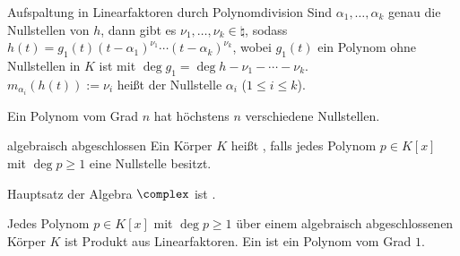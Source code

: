 \begin{Satz}{Aufspaltung in Linearfaktoren durch Polynomdivision}
    Sind $\alpha_1, \ldots, \alpha_k$ genau die Nullstellen von $h$, dann
    gibt es $\nu_1, \ldots, \nu_k \in \natural$, sodass
    $h(t) = g_1(t) (t - \alpha_1)^{\nu_1} \cdots (t - \alpha_k)^{\nu_k}$,
    wobei $g_1(t)$ ein Polynom ohne Nullstellen in $K$ ist mit
    $\deg g_1 = \deg h - \nu_1 - \cdots - \nu_k$. \\
    $m_{\alpha_i}(h(t)) := \nu_i$ heißt  der Nullstelle
    $\alpha_i$ ($1 \le i \le k$).
\end{Satz}

\begin{Kor}
    Ein Polynom vom Grad $n$ hat höchstens $n$ verschiedene Nullstellen.
\end{Kor}

\begin{Def}{algebraisch abgeschlossen}
    Ein Körper $K$ heißt , falls jedes
    Polynom $p \in K[x]$ mit $\deg p \ge 1$ eine Nullstelle besitzt.
\end{Def}

\begin{Fakt}{Hauptsatz der Algebra}
    $\complex$ ist .
\end{Fakt}

\begin{Kor}
    Jedes Polynom $p \in K[x]$ mit $\deg p \ge 1$ über einem algebraisch
    abgeschlossenen Körper $K$ ist Produkt aus Linearfaktoren.
    Ein  ist ein Polynom vom Grad $1$.
\end{Kor}

\pagebreak
